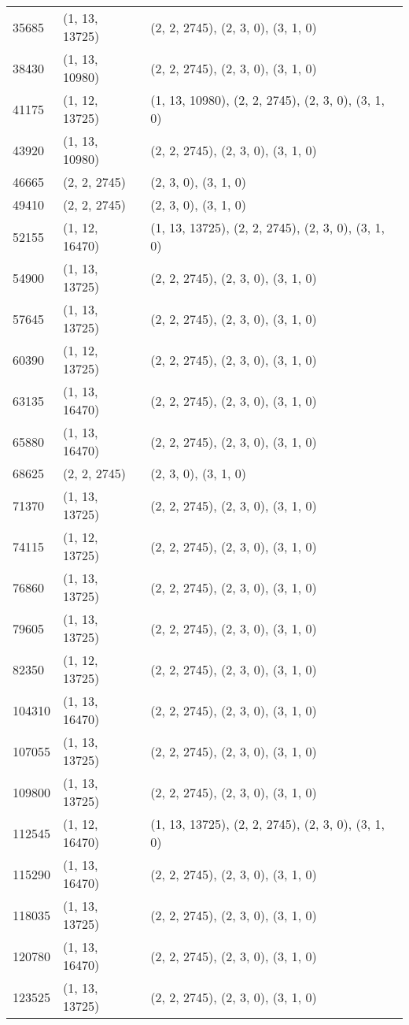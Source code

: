 \begin{center}
\begin{longtable}{|l|l|l|}
35685 & (1, 13, 13725) & (2, 2, 2745), (2, 3, 0), (3, 1, 0) \\
38430 & (1, 13, 10980) & (2, 2, 2745), (2, 3, 0), (3, 1, 0) \\
41175 & (1, 12, 13725) & (1, 13, 10980), (2, 2, 2745), (2, 3, 0), (3, 1, 0) \\
43920 & (1, 13, 10980) & (2, 2, 2745), (2, 3, 0), (3, 1, 0) \\
46665 & (2, 2, 2745) & (2, 3, 0), (3, 1, 0) \\
49410 & (2, 2, 2745) & (2, 3, 0), (3, 1, 0) \\
52155 & (1, 12, 16470) & (1, 13, 13725), (2, 2, 2745), (2, 3, 0), (3, 1, 0) \\
54900 & (1, 13, 13725) & (2, 2, 2745), (2, 3, 0), (3, 1, 0) \\
57645 & (1, 13, 13725) & (2, 2, 2745), (2, 3, 0), (3, 1, 0) \\
60390 & (1, 12, 13725) & (2, 2, 2745), (2, 3, 0), (3, 1, 0) \\
63135 & (1, 13, 16470) & (2, 2, 2745), (2, 3, 0), (3, 1, 0) \\
65880 & (1, 13, 16470) & (2, 2, 2745), (2, 3, 0), (3, 1, 0) \\
68625 & (2, 2, 2745) & (2, 3, 0), (3, 1, 0) \\
71370 & (1, 13, 13725) & (2, 2, 2745), (2, 3, 0), (3, 1, 0) \\
74115 & (1, 12, 13725) & (2, 2, 2745), (2, 3, 0), (3, 1, 0) \\
76860 & (1, 13, 13725) & (2, 2, 2745), (2, 3, 0), (3, 1, 0) \\
79605 & (1, 13, 13725)& (2, 2, 2745), (2, 3, 0), (3, 1, 0) \\
82350 & (1, 12, 13725) & (2, 2, 2745), (2, 3, 0), (3, 1, 0) \\
104310 & (1, 13, 16470) & (2, 2, 2745), (2, 3, 0), (3, 1, 0) \\
107055 & (1, 13, 13725) & (2, 2, 2745), (2, 3, 0), (3, 1, 0) \\
109800 & (1, 13, 13725) & (2, 2, 2745), (2, 3, 0), (3, 1, 0) \\
112545 & (1, 12, 16470) & (1, 13, 13725), (2, 2, 2745), (2, 3, 0), (3, 1, 0) \\
115290 & (1, 13, 16470) & (2, 2, 2745), (2, 3, 0), (3, 1, 0) \\
118035 & (1, 13, 13725) & (2, 2, 2745), (2, 3, 0), (3, 1, 0) \\
120780 & (1, 13, 16470) & (2, 2, 2745), (2, 3, 0), (3, 1, 0) \\
123525 & (1, 13, 13725) & (2, 2, 2745), (2, 3, 0), (3, 1, 0) \\

\end{longtable}
\end{center}
